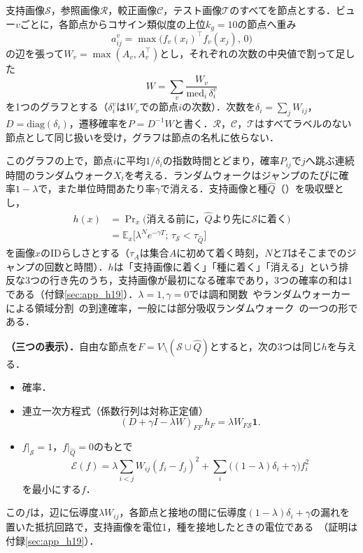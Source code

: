 支持画像$\mathcal{S}$，参照画像$\mathcal{R}$，較正画像$\mathcal{C}$，テスト画像$\mathcal{T}$のすべてを節点とする．ビュー$v$ごとに，各節点からコサイン類似度の上位$k_g{=}10$の節点へ重み
\begin{equation*}
a^v_{ij}=\max\big(f_v(x_i)^{\top}f_v(x_j),\,0\big)
\end{equation*}
の辺を張って$W_v=\max(A_v,A_v^{\top})$とし，それぞれの次数の中央値で割って足した
\begin{equation*}
W=\sum_v\frac{W_v}{\mathrm{med}_i\,\delta^v_i}
\end{equation*}
を1つのグラフとする（$\delta^v_i$は$W_v$での節点$i$の次数）．次数を$\delta_i=\sum_jW_{ij}$，$D=\mathrm{diag}(\delta_i)$，遷移確率を$P=D^{-1}W$と書く．$\mathcal{R}$，$\mathcal{C}$，$\mathcal{T}$はすべてラベルのない節点として同じ扱いを受け，グラフは節点の名札に依らない．

このグラフの上で，節点$i$に平均$1/\delta_i$の指数時間とどまり，確率$P_{ij}$で$j$へ跳ぶ連続時間のランダムウォーク$X_t$を考える．ランダムウォークはジャンプのたびに確率$1-\lambda$で，また単位時間あたり率$\gamma$で消える．支持画像と種$\hat{Q}$（）を吸収壁とし，
\begin{equation}
\begin{aligned}
h(x)&=\Pr\nolimits_x\big(\text{消える前に，}\hat{Q}\text{より先に}\mathcal{S}\text{に着く}\big)\\
&=\mathbb{E}_x\big[\lambda^{N}e^{-\gamma T};\,\tau_{\mathcal{S}}<\tau_{\hat{Q}}\big]
\end{aligned}
\label{eq:h}
\end{equation}
を画像$x$のIDらしさとする（$\tau_A$は集合$A$に初めて着く時刻，$N$と$T$はそこまでのジャンプの回数と時間）．$h$は「支持画像に着く」「種に着く」「消える」という排反な3つの行き先のうち，支持画像が最初になる確率であり，3つの確率の和は1である（付録\ref{sec:app_h19}）．$\lambda{=}1,\gamma{=}0$では調和関数~\cite{zhu2003harmonic}やランダムウォーカーによる領域分割~\cite{grady2006rw}の到達確率，一般には部分吸収ランダムウォーク~\cite{wu2012parw}の一つの形である．

\appblock
\textbf{\TFaces（三つの表示）．}自由な節点を$F=V\setminus(\mathcal{S}\cup\hat{Q})$とすると，次の3つは同じ$h$を与える．
\begin{itemize}
\item[(i)] 確率．
\item[(ii)] 連立一次方程式（係数行列は対称正定値）
\begin{equation*}
(D+\gamma I-\lambda W)_{FF}\,h_F=\lambda W_{F\mathcal{S}}\mathbf{1}.
\end{equation*}
\item[(iii)] $f|_{\mathcal{S}}=1$，$f|_{\hat{Q}}=0$のもとで
\begin{equation}
\mathcal{E}(f)=\lambda\sum_{i<j}W_{ij}(f_i-f_j)^2+\sum_i\big((1-\lambda)\delta_i+\gamma\big)f_i^2
\label{eq:energy}
\end{equation}
を最小にする$f$．
\end{itemize}
この$f$は，辺に伝導度$\lambda W_{ij}$，各節点と接地の間に伝導度$(1-\lambda)\delta_i+\gamma$の漏れを置いた抵抗回路で，支持画像を電位1，種を接地したときの電位である~\cite{doyle1984}（証明は付録\ref{sec:app_h19}）．

